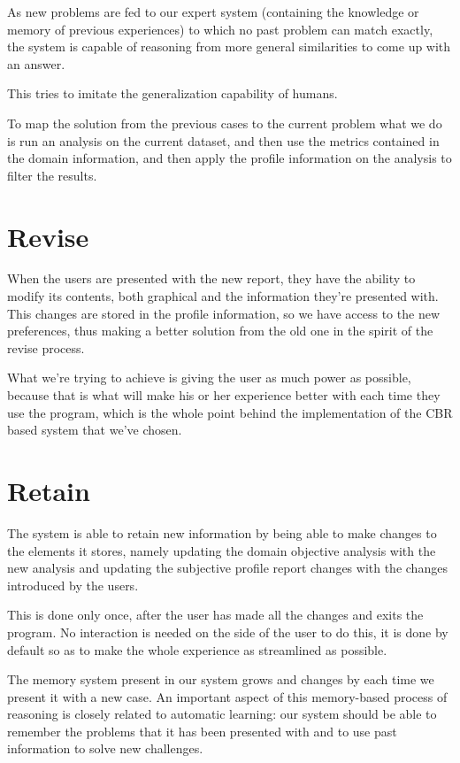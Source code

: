 As new problems are fed to our expert system (containing the knowledge or memory of previous experiences) to which no past problem can match exactly, the system is capable of reasoning from more general similarities to come up with an answer. 

This tries to imitate the generalization capability of humans.

To map the solution from the previous cases to the current problem what we do is run an analysis on the current dataset, and then use the metrics contained in the domain information, and then apply the profile information on the analysis to filter the results.

\section{Revise}
\label{cap5:sec:revise}
When the users are presented with the new report, they have the ability to modify its contents, both graphical and the information they're presented with. This changes are stored in the profile information, so we have access to the new preferences, thus making a better solution from the old one in the spirit of the revise process.

What we're trying to achieve is giving the user as much power as possible, because that is what will make his or her experience better with each time they use the program, which is the whole point behind the implementation of the CBR based system that we've chosen.

\section{Retain}
\label{cap5:sec:retain}
The system is able to retain new information by being able to make changes to the elements it stores, namely updating the domain objective analysis with the new analysis and updating the subjective profile report changes with the changes introduced by the users.

This is done only once, after the user has made all the changes and exits the program. No interaction is needed on the side of the user to do this, it is done by default so as to make the whole experience as streamlined as possible.

The memory system present in our system grows and changes by each time we present it with a new case. An important aspect of this memory-based process of reasoning is closely related to automatic learning: our system should be able to remember the problems that it has been presented with and to use past information to solve new challenges.

